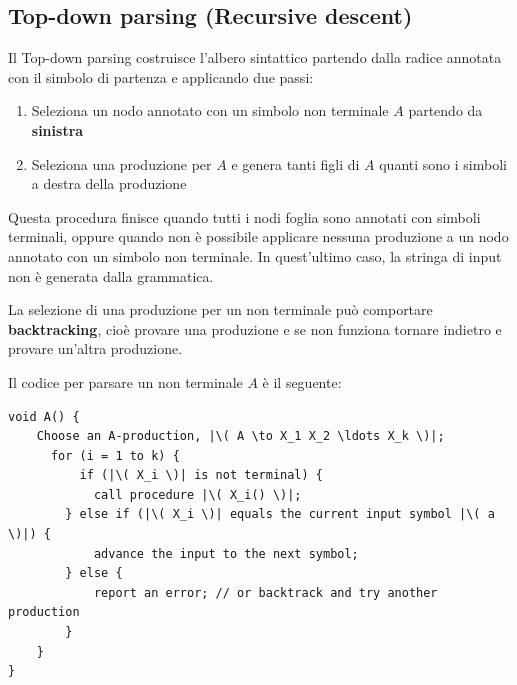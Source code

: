 \documentclass[a4paper]{article}
\begin{document}
\subsection{Top-down parsing (Recursive descent)}
Il Top-down parsing costruisce l'albero sintattico partendo dalla radice annotata con
il simbolo di partenza e applicando due passi:
\begin{enumerate}
  \item Seleziona un nodo annotato con un simbolo non terminale \( A \) partendo
    da \textbf{sinistra}

  \item Seleziona una produzione per \( A \) e genera tanti figli di \( A \) quanti
    sono i simboli a destra della produzione
\end{enumerate}
Questa procedura finisce quando tutti i nodi foglia sono annotati con simboli terminali,
oppure quando non è possibile applicare nessuna produzione a un nodo annotato con un
simbolo non terminale. In quest'ultimo caso, la stringa di input non è generata dalla
grammatica.

\noindent
La selezione di una produzione per un non terminale può comportare \textbf{backtracking},
cioè provare una produzione e se non funziona tornare indietro e provare un'altra produzione.

\begin{example}
  Il codice per parsare un non terminale \( A \) è il seguente:
\begin{lstlisting}[escapechar=|, basicstyle=\rmfamily, columns=fullflexible, keepspaces=true]
void A() {
    Choose an A-production, |\( A \to X_1 X_2 \ldots X_k \)|;
      for (i = 1 to k) {
          if (|\( X_i \)| is not terminal) {
            call procedure |\( X_i() \)|;
        } else if (|\( X_i \)| equals the current input symbol |\( a \)|) {
            advance the input to the next symbol;
        } else {
            report an error; // or backtrack and try another production
        }
    }
}
\end{lstlisting}
\end{example}
\end{document}
